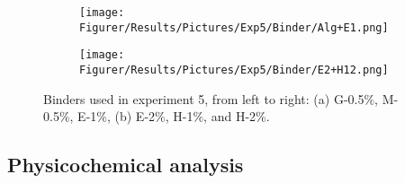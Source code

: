\begin{figure}[H]
\captionsetup[subfigure]{justification=Centering}

\begin{subfigure}[t]{0.4\textwidth}
    \texttt{[image: Figurer/Results/Pictures/Exp5/Binder/Alg+E1.png]}
    \caption{}
\end{subfigure}
\begin{subfigure}[t]{0.4\textwidth}
    \texttt{[image: Figurer/Results/Pictures/Exp5/Binder/E2+H12.png]}
    \caption{}
\end{subfigure}

\caption{Binders used in experiment 5, from left to right: (a) G-0.5\%, M-0.5\%, E-1\%, (b) E-2\%, H-1\%, and H-2\%.} 
\label{fig:Binders:Exp5}
\end{figure}


\subsection{Physicochemical analysis}
\label{app:stat:CookLoss}

